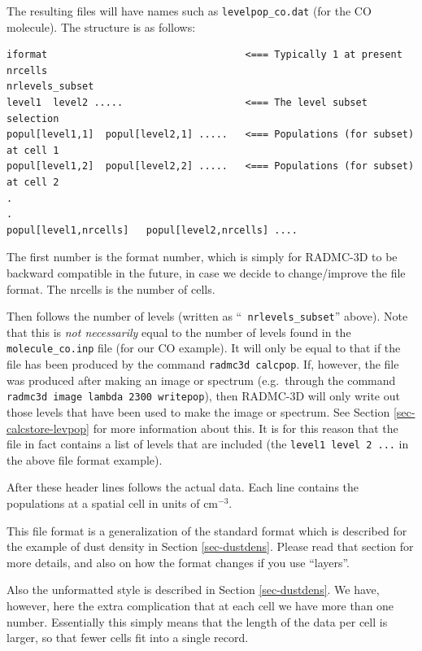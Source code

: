 \documentclass{report}
\newenvironment{asciibox}%
  {\begin{list}{}{%
    \setlength{\topsep}{0.5em}%
    \setlength{\parskip}{0em}%
    \setlength{\parsep}{0em}%
    \setlength{\itemsep}{0em}%
    \setlength{\rightmargin}{0em}%
    \setlength{\leftmargin}{3.0em}%
    \setlength{\labelsep}{1em}%
    \setlength{\labelwidth}{2em}%
  }\normalfont\footnotesize\item}
  {\end{list}}
\begin{document}
The resulting files will have names such as {\small\tt levelpop\_co.dat}
(for the CO molecule). The structure is as follows:
\begin{asciibox}\begin{verbatim}
iformat                                  <=== Typically 1 at present
nrcells
nrlevels_subset
level1  level2 .....                     <=== The level subset selection
popul[level1,1]  popul[level2,1] .....   <=== Populations (for subset) at cell 1
popul[level1,2]  popul[level2,2] .....   <=== Populations (for subset) at cell 2
.
.
popul[level1,nrcells]   popul[level2,nrcells] ....
\end{verbatim}\end{asciibox}
The first number is the format number, which is simply for RADMC-3D to be
backward compatible in the future, in case we decide to change/improve the
file format. The nrcells is the number of cells. 

Then follows the number of levels (written as ``{\small\tt
  nrlevels\_subset}'' above). Note that this is {\em not necessarily} equal
to the number of levels found in the {\small\tt molecule\_co.inp} file (for
our CO example). It will only be equal to that if the file has been produced
by the command {\small\tt radmc3d calcpop}. If, however, the file was
produced after making an image or spectrum (e.g.\ through the command
{\small\tt radmc3d image lambda 2300 writepop}), then RADMC-3D will only
write out those levels that have been used to make the image or
spectrum. See Section \ref{sec-calcstore-levpop} for more information about
this. It is for this reason that the file in fact contains a list of
levels that are included (the {\small\tt level1  level 2 ...} in the 
above file format example).

After these header lines follows the actual data. Each line contains the
populations at a spatial cell in units of cm$^{-3}$. 

This file format is a generalization of the standard format which is
described for the example of dust density in Section \ref{sec-dustdens}.
Please read that section for more details, and also on how the format
changes if you use ``layers''. 

Also the unformatted style is described in Section \ref{sec-dustdens}. We
have, however, here the extra complication that at each cell we have more
than one number. Essentially this simply means that the length of the data
per cell is larger, so that fewer cells fit into a single record.
\end{document}
